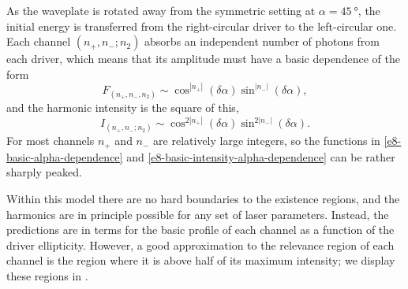 As the waveplate is rotated away from the symmetric setting at $\alpha=\SI{45}{\degree}$, the initial energy is transferred from the right-circular driver to the left-circular one. Each channel $(n_+,n_-;n_2)$ absorbs an independent number of photons from each driver, which means that its amplitude must have a basic dependence of the form
\begin{equation}
 F_{(n_+,n_-,n_2)}\sim\cos^{|n_+|}(\delta\alpha)\sin^{|n_-|}(\delta\alpha),
 \label{e8-basic-alpha-dependence}
\end{equation}
and the harmonic intensity is the square of this,
\begin{equation}
 I_{(n_+,n_-;n_2)}\sim\cos^{2|n_+|}(\delta\alpha)\sin^{2|n_-|}(\delta\alpha).
 \label{e8-basic-intensity-alpha-dependence}
\end{equation}
For most channels $n_+$ and $n_-$ are relatively large integers, so the functions in \eqref{e8-basic-alpha-dependence} and \eqref{e8-basic-intensity-alpha-dependence} can be rather sharply peaked. 



Within this model there are no hard boundaries to the existence regions, and the harmonics are in principle possible for any set of laser parameters. Instead, the predictions are in terms for the basic profile of each channel as a function of the driver ellipticity. However, a good approximation to the relevance region of each channel is the region where it is above half of its maximum intensity; we display these regions in . 




